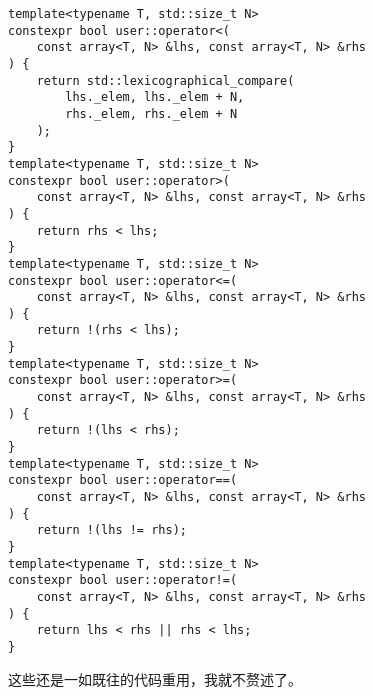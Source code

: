 \begin{lstlisting}
template<typename T, std::size_t N>
constexpr bool user::operator<(
    const array<T, N> &lhs, const array<T, N> &rhs
) {
    return std::lexicographical_compare(
        lhs._elem, lhs._elem + N,
        rhs._elem, rhs._elem + N
    );
}
template<typename T, std::size_t N>
constexpr bool user::operator>(
    const array<T, N> &lhs, const array<T, N> &rhs
) {
    return rhs < lhs;
}
template<typename T, std::size_t N>
constexpr bool user::operator<=(
    const array<T, N> &lhs, const array<T, N> &rhs
) {
    return !(rhs < lhs);
}
template<typename T, std::size_t N>
constexpr bool user::operator>=(
    const array<T, N> &lhs, const array<T, N> &rhs
) {
    return !(lhs < rhs);
}
template<typename T, std::size_t N>
constexpr bool user::operator==(
    const array<T, N> &lhs, const array<T, N> &rhs
) {
    return !(lhs != rhs);
}
template<typename T, std::size_t N>
constexpr bool user::operator!=(
    const array<T, N> &lhs, const array<T, N> &rhs
) {
    return lhs < rhs || rhs < lhs;
}
\end{lstlisting}
这些还是一如既往的代码重用，我就不赘述了。\par
